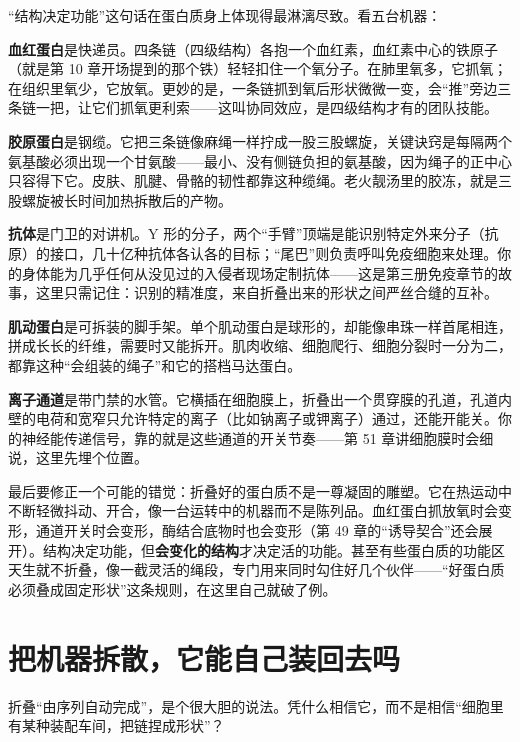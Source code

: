 “结构决定功能”这句话在蛋白质身上体现得最淋漓尽致。看五台机器：

\textbf{血红蛋白}是快递员。四条链（四级结构）各抱一个血红素，血红素中心的铁原子（就是第 10 章开场提到的那个铁）轻轻扣住一个氧分子。在肺里氧多，它抓氧；在组织里氧少，它放氧。更妙的是，一条链抓到氧后形状微微一变，会“推”旁边三条链一把，让它们抓氧更利索——这叫协同效应，是四级结构才有的团队技能。

\textbf{胶原蛋白}是钢缆。它把三条链像麻绳一样拧成一股三股螺旋，关键诀窍是每隔两个氨基酸必须出现一个甘氨酸——最小、没有侧链负担的氨基酸，因为绳子的正中心只容得下它。皮肤、肌腱、骨骼的韧性都靠这种缆绳。老火靓汤里的胶冻，就是三股螺旋被长时间加热拆散后的产物。

\textbf{抗体}是门卫的对讲机。Y 形的分子，两个“手臂”顶端是能识别特定外来分子（抗原）的接口，几十亿种抗体各认各的目标；“尾巴”则负责呼叫免疫细胞来处理。你的身体能为几乎任何从没见过的入侵者现场定制抗体——这是第三册免疫章节的故事，这里只需记住：识别的精准度，来自折叠出来的形状之间严丝合缝的互补。

\textbf{肌动蛋白}是可拆装的脚手架。单个肌动蛋白是球形的，却能像串珠一样首尾相连，拼成长长的纤维，需要时又能拆开。肌肉收缩、细胞爬行、细胞分裂时一分为二，都靠这种“会组装的绳子”和它的搭档马达蛋白。

\textbf{离子通道}是带门禁的水管。它横插在细胞膜上，折叠出一个贯穿膜的孔道，孔道内壁的电荷和宽窄只允许特定的离子（比如钠离子或钾离子）通过，还能开能关。你的神经能传递信号，靠的就是这些通道的开关节奏——第 51 章讲细胞膜时会细说，这里先埋个位置。

最后要修正一个可能的错觉：折叠好的蛋白质不是一尊凝固的雕塑。它在热运动中不断轻微抖动、开合，像一台运转中的机器而不是陈列品。血红蛋白抓放氧时会变形，通道开关时会变形，酶结合底物时也会变形（第 49 章的“诱导契合”还会展开）。结构决定功能，但\textbf{会变化的结构}才决定活的功能。甚至有些蛋白质的功能区天生就不折叠，像一截灵活的绳段，专门用来同时勾住好几个伙伴——“好蛋白质必须叠成固定形状”这条规则，在这里自己就破了例。

\section{把机器拆散，它能自己装回去吗}

折叠“由序列自动完成”，是个很大胆的说法。凭什么相信它，而不是相信“细胞里有某种装配车间，把链捏成形状”？

